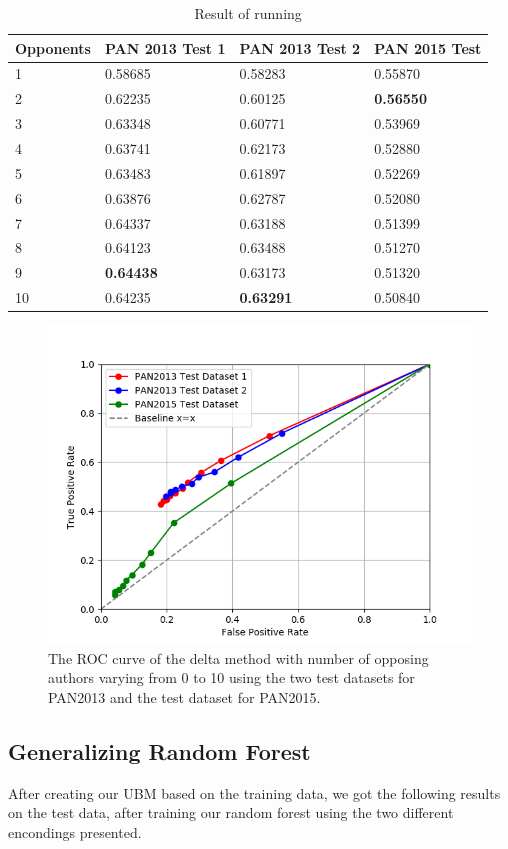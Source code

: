 \begin{table}
    \begin{tabular}{l|lll}
        \textbf{Opponents} & \textbf{PAN 2013 Test 1} & \textbf{PAN 2013 Test 2}
        & \textbf{PAN 2015 Test} \\ \hline
        1  & 0.58685 & 0.58283 & 0.55870 \\
        2  & 0.62235 & 0.60125 & \textbf{0.56550} \\
        3  & 0.63348 & 0.60771 & 0.53969 \\
        4  & 0.63741 & 0.62173 & 0.52880 \\
        5  & 0.63483 & 0.61897 & 0.52269 \\
        6  & 0.63876 & 0.62787 & 0.52080 \\
        7  & 0.64337 & 0.63188 & 0.51399 \\
        8  & 0.64123 & 0.63488 & 0.51270 \\
        9  & \textbf{0.64438} & 0.63173 & 0.51320 \\
        10 & 0.64235 & \textbf{0.63291} & 0.50840
    \end{tabular}
    \caption{Result of running}
    \label{tab:delta_method_final_results}
\end{table}

\begin{figure}
    \centering
    \includegraphics[width=.7\textwidth]{./pictures/delta_method_roc.png}
    \caption{The ROC curve of the delta method with number of opposing authors
    varying from 0 to 10 using the two test datasets for PAN2013 and the test
    dataset for PAN2015.}
    \label{fig:delta_method_roc}
\end{figure}

\subsection{Generalizing Random Forest}
After creating our \gls{UBM} based on the training data, we got the following results on the test 
data, after training our random forest using the two different encondings presented.

